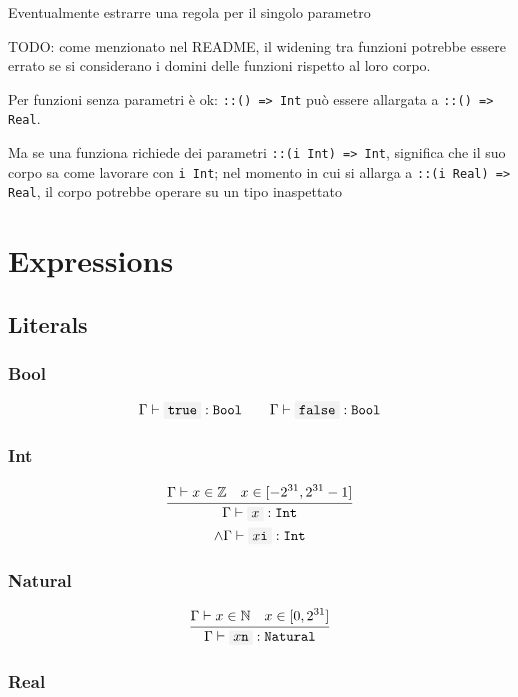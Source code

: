 \documentclass[11pt]{report}
\newcommand{\infrule}[3][gathered]{\frac{\begin{#1}#2\end{#1}}{\begin{gathered}#3\end{gathered}}}
\newcommand{\then}{\vdash}
\newcommand{\code}[1]{\texttt{\colorbox{gray!10}{#1}}}
\newcommand{\Bool}{\texttt{Bool}}
\newcommand{\Int}{\texttt{Int}}
\newcommand{\Natural}{\texttt{Natural}}
\newcommand{\Env}{\Gamma}
\theoremstyle{definition}
\newcommand{\comment}[1]{
	\parbox{0.9\linewidth}{\color{black!30}\small\sffamily #1}
}
\begin{document}
\comment{Eventualmente estrarre una regola per il singolo parametro}

\comment{
	TODO: come menzionato nel README, il widening tra funzioni potrebbe essere
	errato se si considerano i domini delle funzioni rispetto al loro corpo.

	Per funzioni senza parametri è ok: \code{::() => Int} può essere allargata
	a \code{::() => Real}.

	Ma se una funziona richiede dei parametri \code{::(i Int) => Int},
	significa che il suo corpo sa come lavorare con \code{i Int}; nel momento
	in cui si allarga a \code{::(i Real) => Real}, il corpo potrebbe operare su
	un tipo inaspettato
}

\newpage

\section{Expressions}

\subsection{Literals}

\subsubsection{Bool}

\[
	\Env\then \code{true}:\Bool \qquad \Env \then \code{false}:\Bool
\]

\subsubsection{Int}

\[
	\infrule{
		\Env\then x \in \mathbb{Z} \quad x \in [-2^{31}, 2^{31} - 1]
	}{
		\Env\then \code{$x$} : \Int \\*
		\land \Env\then \code{$x$i} : \Int
	}
\]


\subsubsection{Natural}

\[
	\infrule{
		\Env\then x \in \mathbb{N} \quad x \in [0, 2^{31}]
	}{
		\Env\then \code{$x$n} : \Natural
	}
\]


\subsubsection{Real}
\end{document}
